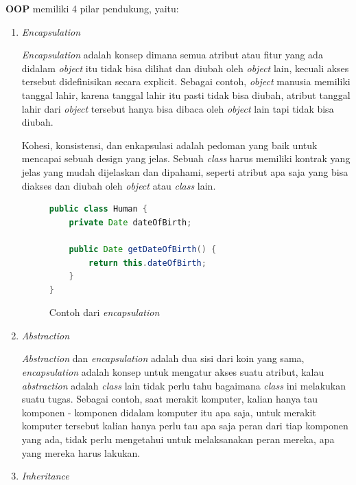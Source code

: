 \documentclass[a4paper]{article}
\begin{document}
\textbf{OOP} memiliki 4 pilar pendukung, yaitu:
\begin{enumerate}

    \item \textit{Encapsulation}

          \textit{Encapsulation} adalah konsep dimana semua atribut atau fitur yang ada didalam \textit{object} itu tidak bisa dilihat dan diubah oleh \textit{object} lain, kecuali akses tersebut didefinisikan secara explicit\autocite{education-erin-oop-2020}. Sebagai contoh, \textit{object} manusia memiliki tanggal lahir, karena tanggal lahir itu pasti tidak bisa diubah, atribut tanggal lahir dari \textit{object} tersebut hanya bisa dibaca oleh \textit{object} lain tapi tidak bisa diubah.

          Kohesi, konsistensi, dan enkapsulasi adalah pedoman yang baik untuk mencapai sebuah design yang jelas. Sebuah \textit{class} harus memiliki kontrak yang jelas yang mudah dijelaskan dan dipahami, seperti atribut apa saja yang bisa diakses dan diubah oleh \textit{object} atau \textit{class} lain\autocite{liang_liang_2021}.

          \begin{figure}[h]
              \centering
              \begin{lstlisting}[language=Java]
public class Human {
    private Date dateOfBirth;

    public Date getDateOfBirth() {
        return this.dateOfBirth;
    }
}\end{lstlisting}
              \caption{Contoh dari \textit{encapsulation}}
          \end{figure}
          \newpage

    \item \textit{Abstraction}

          \textit{Abstraction} dan \textit{encapsulation} adalah dua sisi dari koin yang sama, \textit{encapsulation} adalah konsep untuk mengatur akses suatu atribut, kalau \textit{abstraction} adalah \textit{class} lain tidak perlu tahu bagaimana \textit{class} ini melakukan suatu tugas\autocite{liang_liang_2021}. Sebagai contoh, saat merakit komputer, kalian hanya tau komponen - komponen didalam komputer itu apa saja, untuk merakit komputer tersebut kalian hanya perlu tau apa saja peran dari tiap komponen yang ada, tidak perlu mengetahui untuk melaksanakan peran mereka, apa yang mereka harus lakukan.

    \item \textit{Inheritance}


\end{enumerate}
\end{document}
